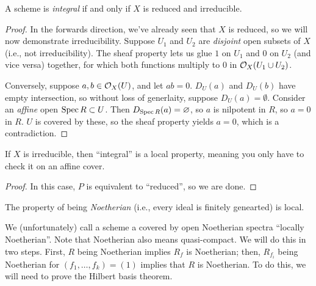 \begin{theorem} \label{thm:integral_scheme_iff_reduced_irred}
    A scheme is \textit{integral} if and only if $X$ is reduced and irreducible.
\end{theorem}
\begin{proof}
    In the forwards direction, we've already seen that $X$ is reduced, so we will now demonstrate irreducibility. Suppose $U_1$ and $U_2$ are \textit{disjoint} open subsets of $X$ (i.e., not irreducibility). The sheaf property lets us glue $1$ on $U_1$ and $0$ on $U_2$ (and vice versa) together, for which both functions multiply to $0$ in $\mathcal O_X(U_1 \cup U_2)$.

    Conversely, suppose $a, b \in \mathcal O_X(U)$, and let $ab = 0$. $D_U(a)$ and $D_U(b)$  have empty intersection, so without loss of generlaity, suppose $D_U(a) = \emptyset$. Consider an \textit{affine} open $\operatorname{Spec} R \subset U$. Then $D_{\operatorname{Spec} R}(a) = \varnothing$, so $a$ is nilpotent in $R$, so $a = 0$ in $R$. $U$ is covered by these, so the sheaf property yields $a = 0$, which is a contradiction.
\end{proof}

\begin{corollary} \label{cor:irreducible_scheme_has_integral_local_property}
    If $X$ is irreducible, then ``integral'' is a local property, meaning you only have to check it on an affine cover.
\end{corollary}
\begin{proof}
    In this case, $P$ is equivalent to ``reduced'', so we are done.
\end{proof}

\begin{theorem} \label{thm:noetherian_is_local_property}
    The property of being \textit{Noetherian} (i.e., every ideal is finitely genearted) is local.
\end{theorem}
We (unfortunately) call a scheme a covered by open Noetherian spectra ``locally Noetherian''. Note that Noetherian also means quasi-compact. We will do this in two steps. First, $R$ being Noetherian implies $R_f$ is Noetherian; then, $R_{f_i}$ being Noetherian for $(f_1, \dots, f_k) = (1)$ implies that $R$ is Noetherian. To do this, we will need to prove the Hilbert basis theorem.

